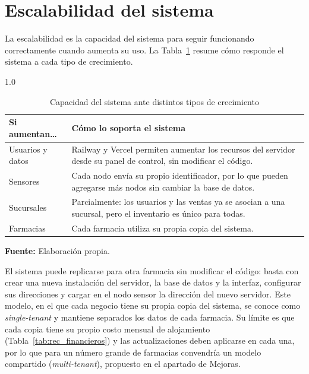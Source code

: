 

\section{Escalabilidad del sistema}

La escalabilidad es la capacidad del sistema para seguir funcionando correctamente cuando aumenta su uso. La Tabla~\ref{tab:cap3-escalabilidad} resume cómo responde el sistema a cada tipo de crecimiento.

\begin{table}[H]
\centering
\caption{Capacidad del sistema ante distintos tipos de crecimiento}
\label{tab:cap3-escalabilidad}
\begin{spacing}{1.0}
\renewcommand{\arraystretch}{1.2}
\begin{tabularx}{\textwidth}{@{}>{\raggedright}p{3.2cm} X@{}}
\toprule
\textbf{Si aumentan\ldots} & \textbf{Cómo lo soporta el sistema} \\
\midrule
Usuarios y datos & Railway y Vercel permiten aumentar los recursos del servidor desde su panel de control, sin modificar el código. \\[4pt]
Sensores & Cada nodo envía su propio identificador, por lo que pueden agregarse más nodos sin cambiar la base de datos. \\[4pt]
Sucursales & Parcialmente: los usuarios y las ventas ya se asocian a una sucursal, pero el inventario es único para todas. \\[4pt]
Farmacias & Cada farmacia utiliza su propia copia del sistema. \\
\bottomrule
\end{tabularx}
\end{spacing}
\vspace{0.2cm}
{\footnotesize \textbf{Fuente:} Elaboración propia.}
\end{table}

El sistema puede replicarse para otra farmacia sin modificar el código: basta con crear una nueva instalación del servidor, la base de datos y la interfaz, configurar sus direcciones y cargar en el nodo sensor la dirección del nuevo servidor. Este modelo, en el que cada negocio tiene su propia copia del sistema, se conoce como \textit{single-tenant} y mantiene separados los datos de cada farmacia. Su límite es que cada copia tiene su propio costo mensual de alojamiento (Tabla~\ref{tab:rec_financieros}) y las actualizaciones deben aplicarse en cada una, por lo que para un número grande de farmacias convendría un modelo compartido (\textit{multi-tenant}), propuesto en el apartado de Mejoras.

